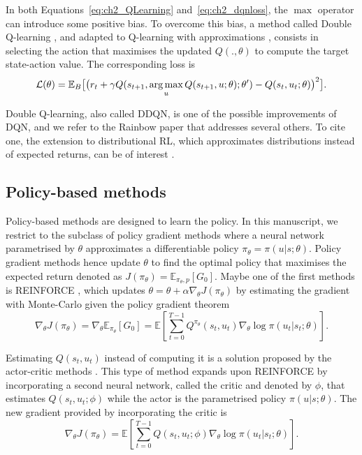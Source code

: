 In both Equations~\ref{eq:ch2_QLearning} and~\ref{eq:ch2_dqnloss}, the $\max$ operator can introduce some positive bias. 
To overcome this bias, a method called Double Q-learning \citep{hasselt2010double}, and adapted to Q-learning with approximations \citep{van2016deep}, consists in selecting the action that maximises the updated $Q(., \theta)$ to compute the target state-action value.
The corresponding loss is 
\begin{equation}
    \label{eq:ch2_doubleQ}
    \mathcal{L}(\theta) = \mathbb{E}_{B} \big[\big(r_{t} + \gamma Q(s_{t+1}, \operatorname*{arg\,max}_u Q(s_{t+1}, u;\theta) ; \theta')- Q(s_{t}, u_{t}; \theta)\big)^{2}\big].
\end{equation}

Double Q-learning, also called DDQN, is one of the possible improvements of DQN, and we refer to the Rainbow paper \citep{hessel2018rainbow} that addresses several others.
To cite one, the extension to distributional RL, which approximates distributions instead of expected returns, can be of interest \citep{bellemare2017distributional, THEATE2023199}. 

\subsection{Policy-based methods} \label{sec:ch2_policy_based_methods}
Policy-based methods are designed to learn the policy.
In this manuscript, we restrict to the subclass of policy gradient methods where a neural network parametrised by $\theta$ approximates a differentiable policy $\pi_\theta=\pi(u|s;\theta)$.
Policy gradient methods hence update $\theta$ to find the optimal policy that maximises the expected return denoted as  $J(\pi_\theta) = \mathbb{E}_{\pi_\theta, p}[G_0]$.
Maybe one of the first methods is REINFORCE \citep{williams1992simple}, which updates $\theta = \theta + \alpha \nabla_\theta J(\pi_\theta)$ by estimating the gradient with Monte-Carlo given the policy gradient theorem \citep{sutton1999policy} 
\begin{equation}
\label{eq:ch2_reinforce_grad}
    \nabla_\theta J(\pi_\theta) = \nabla_\theta \mathbb{E}_{\pi_\theta}[G_0] = \mathbb{E}\left[\sum_{t=0}^{T-1} Q^{\pi_\theta}(s_t, u_t) \nabla_\theta \log \pi(u_t|s_t;\theta)\right].
\end{equation}

Estimating $Q(s_t, u_t)$ instead of computing it is a solution proposed by the actor-critic methods \citep{sutton1999policy,konda1999actor}.
This type of method expands upon REINFORCE by incorporating a second neural network, called the critic and denoted by $\phi$, that estimates $Q(s_t, u_t;\phi)$ while the actor is the parametrised policy $\pi(u|s;\theta)$.
The new gradient provided by incorporating the critic is
\begin{equation}
\label{eq:ch2_Q_actor_crit}
    \nabla_\theta J(\pi_\theta) = \mathbb{E}\left[\sum_{t=0}^{T-1} Q(s_t, u_t;\phi) \nabla_\theta \log \pi(u_t|s_t;\theta)\right].
\end{equation}

